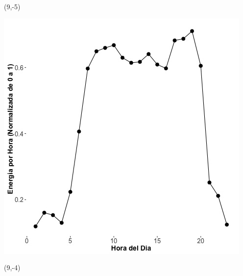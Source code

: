 \documentclass{article}\usepackage[]{graphicx}\usepackage[]{color}
\newenvironment{knitrout}{}{} %
\begin{document}
 \begin{textblock}{1}(9,-5)
\begin{minipage}{20em}
\begingroup

\endgroup
\end{minipage}
\end{textblock}

\begin{knitrout}
\color{fgcolor}
\includegraphics[scale=0.65]{figure/A26_plot_norm_median} 
\end{knitrout}


 \begin{textblock}{1}(9,-4)
\begin{minipage}{20em}
\begingroup

\endgroup
\end{minipage}
\end{textblock}
\end{document}
